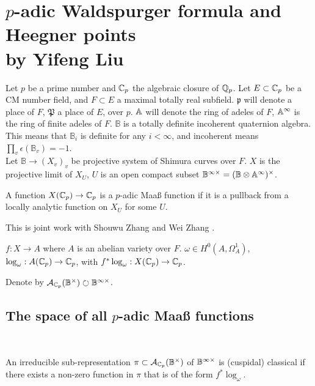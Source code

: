\documentclass[12pt,amsfont]{amsart}
\begin{document}
\newpage
\renewcommand{\thesubsection}{\arabic{section}.\arabic{subsection}}

\section{$p$-adic Waldspurger formula and Heegner points
\\ by Yifeng Liu }\label{16}

Let $p$ be a prime number and ${\mathbb C}_p$ the algebraic closure of ${\mathbb Q}_p$. Let $E \subset {\mathbb C}_p$ be a CM number field, and $F \subset E$ a maximal totally real subfield. $\mathfrak{p}$ will denote a place of $F$, $\mathfrak{P}$ a place of $E$, over $p$. $\mathbb{A}$ will denote the ring of adeles of $F$, $\mathbb{A}^\infty$ is the ring of finite adeles of $F$. $\mathbb{B}$ is a totally definite incoherent quaternion algebra. This means that $\mathbb{B}_i$ is definite for any $i < \infty$, and incoherent means $\displaystyle \prod_v \epsilon(\mathbb{B}_v) = -1$. \\
Let $\mathbb{B} \rightarrow (X_v)_v$ be projective system of Shimura curves over $F$. $X$ is the projective limit of $X_U$, $U$ is an open compact subset $\mathbb{B}^{\infty \times} = (\mathbb{B} \otimes \mathbb{A}^\infty)^\times$. 

\begin{dfn} A function $X({\mathbb C}_p) \rightarrow {\mathbb C}_p$ is a $p$-adic Maa{\ss}  function if it is a pullback from a locally analytic function on $X_U$ for some $U$. 
\end{dfn}

This is joint work with Shouwu Zhang and Wei Zhang . 

\begin{xmp} $f: X \rightarrow A$ where $A$ is an abelian variety over $F$. $\omega \in H^0(A, \Omega_A^1)$, $\log_\omega : A({\mathbb C}_p) \rightarrow {\mathbb C}_p$, with $f^\ast \log_\omega: X({\mathbb C}_p) \rightarrow {\mathbb C}_p$.
\end{xmp}

Denote by $\mathcal{A}_{{\mathbb C}_p}(\mathbb{B}^\times) \circlearrowright \mathbb{B}^{\infty \times}$. 

\subsection{The space of all $p$-adic Maa{\ss}  functions}
{\ }

An irreducible sub-representation $\pi \subset \mathcal{A}_{{\mathbb C}_p}(\mathbb{B}^\times)$ of $\mathbb{B}^{\infty \times}$ is (cuspidal) classical if there exists a non-zero function in $\pi$ that is of the form $f^\ast \log_\omega$. 
\end{document}
